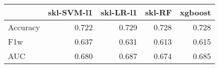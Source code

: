 \begin{tabular}{lrrrr}
\toprule
{} &  skl-SVM-l1 &  skl-LR-l1 &  skl-RF &  xgboost \\
\midrule
Accuracy &       0.722 &      0.729 &   0.728 &    0.728 \\
F1w      &       0.637 &      0.631 &   0.613 &    0.615 \\
AUC      &       0.680 &      0.687 &   0.674 &    0.685 \\
\bottomrule
\end{tabular}
